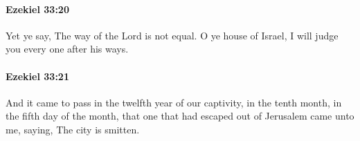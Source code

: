 		\paragraph{Ezekiel 33:20} %
			\label{EZEKIEL-33-20}

			Yet ye say, The way of the Lord is not equal. O ye house of Israel, I will judge you every one after his ways.


		\paragraph{Ezekiel 33:21} %
			\label{EZEKIEL-33-21}

			And it came to pass in the twelfth year of our captivity, in the tenth month, in the fifth day of the month, that one that had escaped out of Jerusalem came unto me, saying, The city is smitten.


